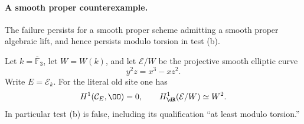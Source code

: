 \paragraph{A smooth proper counterexample.}
The failure persists for a smooth proper scheme admitting a smooth proper algebraic lift, and hence persists modulo torsion in test (b).

\begin{proposition}\label{prop:DE-old-proper}
Let $k=\overline{\mathbb F}_3$, let $W=W(k)$, and let $\mathcal E/W$ be the projective smooth elliptic curve
\[
                         y^2z=x^3-xz^2.
\]
Write $E=\mathcal E_k$.  For the literal old site one has
\[
 H^1(\mathcal C_E,\OO)=0,
 \qquad H^1_{\dR}(\mathcal E/W)\simeq W^2.
\]
In particular test (b) is false, including its qualification ``at least modulo torsion.''
\end{proposition}
